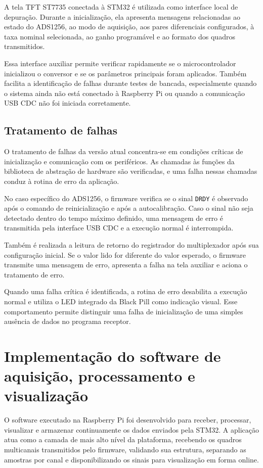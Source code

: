 \documentclass[a4paper,12pt]{fcte}
\begin{document}
A tela TFT ST7735 conectada à STM32 é utilizada como interface local de depuração. Durante a inicialização, ela apresenta mensagens relacionadas ao estado do ADS1256, ao modo de aquisição, aos pares diferenciais configurados, à taxa nominal selecionada, ao ganho programável e ao formato dos quadros transmitidos.

Essa interface auxiliar permite verificar rapidamente se o microcontrolador inicializou o conversor e se os parâmetros principais foram aplicados. Também facilita a identificação de falhas durante testes de bancada, especialmente quando o sistema ainda não está conectado à Raspberry Pi ou quando a comunicação USB CDC não foi iniciada corretamente.

\subsection{Tratamento de falhas}
\label{subsec:tratamento_falhas_firmware}

O tratamento de falhas da versão atual concentra-se em condições críticas de inicialização e comunicação com os periféricos. As chamadas às funções da biblioteca de abstração de hardware são verificadas, e uma falha nessas chamadas conduz à rotina de erro da aplicação.

No caso específico do ADS1256, o firmware verifica se o sinal \texttt{DRDY} é observado após o comando de reinicialização e após a autocalibração. Caso o sinal não seja detectado dentro do tempo máximo definido, uma mensagem de erro é transmitida pela interface USB CDC e a execução normal é interrompida.

Também é realizada a leitura de retorno do registrador do multiplexador após sua configuração inicial. Se o valor lido for diferente do valor esperado, o firmware transmite uma mensagem de erro, apresenta a falha na tela auxiliar e aciona o tratamento de erro.

Quando uma falha crítica é identificada, a rotina de erro desabilita a execução normal e utiliza o LED integrado da Black Pill como indicação visual. Esse comportamento permite distinguir uma falha de inicialização de uma simples ausência de dados no programa receptor.

\section{Implementação do software de aquisição, processamento e visualização}
\label{sec:software}

O software executado na Raspberry Pi foi desenvolvido para receber, processar, visualizar e armazenar continuamente os dados enviados pela STM32. A aplicação atua como a camada de mais alto nível da plataforma, recebendo os quadros multicanais transmitidos pelo firmware, validando sua estrutura, separando as amostras por canal e disponibilizando os sinais para visualização em forma online.
\end{document}
